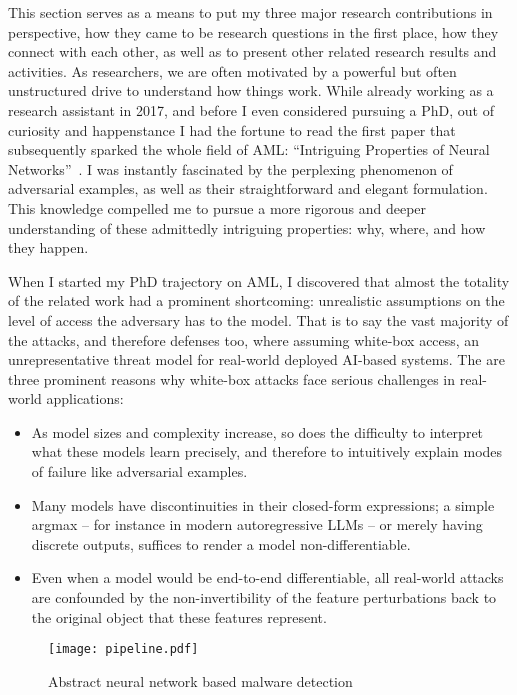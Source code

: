 This section serves as a means to put my three major research contributions in perspective, how they came to be research questions in the first place, how they connect with each other, as well as to present other related research results and activities.
As researchers, we are often motivated by a powerful but often unstructured drive to understand how things work.
While already working as a research assistant in 2017, and before I even considered pursuing a PhD, out of curiosity and happenstance I had the fortune to read the first paper that subsequently sparked the whole field of \gls{AML}: ``Intriguing Properties of Neural Networks''~\cite{szegedy2013intriguing}.
I was instantly fascinated by the perplexing phenomenon of adversarial examples, as well as their straightforward and elegant formulation.
This knowledge compelled me to pursue a more rigorous and deeper understanding of these admittedly intriguing properties: why, where, and how they happen.

When I started my PhD trajectory on \gls{AML}, I discovered that almost the totality of the related work had a prominent shortcoming: unrealistic assumptions on the level of access the adversary has to the model.
That is to say the vast majority of the attacks, and therefore defenses too, where assuming white-box access, an unrepresentative threat model for real-world deployed AI-based systems.
The are three prominent reasons why white-box attacks face serious challenges in real-world applications:

\begin{itemize}
    \item As model sizes and complexity increase, so does the difficulty to interpret what these models learn precisely, and therefore to intuitively explain modes of failure like adversarial examples.
    \item Many models have discontinuities in their closed-form expressions; a simple argmax -- for instance in modern autoregressive LLMs -- or merely having discrete outputs, suffices to render a model non-differentiable.
    \item Even when a model would be end-to-end differentiable, all real-world attacks are confounded by the non-invertibility of the feature perturbations back to the original object that these features represent.
\end{itemize}

\begin{figure}
    \centering
    \texttt{[image: pipeline.pdf]}
    \caption{Abstract neural network based malware detection}
    \label{fig:pipe}
\end{figure}

